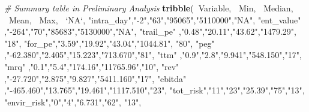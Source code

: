 \documentclass[11pt,a4paper,]{article}
\newenvironment{Shaded}{\begin{snugshade}}{\end{snugshade}}
\newcommand{\CommentTok}[1]{\textcolor[rgb]{0.56,0.35,0.01}{\textit{#1}}}
\newcommand{\DataTypeTok}[1]{\textcolor[rgb]{0.13,0.29,0.53}{#1}}
\newcommand{\KeywordTok}[1]{\textcolor[rgb]{0.13,0.29,0.53}{\textbf{#1}}}
\newcommand{\NormalTok}[1]{#1}
\newcommand{\OperatorTok}[1]{\textcolor[rgb]{0.81,0.36,0.00}{\textbf{#1}}}
\newcommand{\StringTok}[1]{\textcolor[rgb]{0.31,0.60,0.02}{#1}}
\begin{document}
\begin{Shaded}
\begin{Highlighting}[]
\CommentTok{# Summary table in Preliminary Analysis}
\KeywordTok{tribble}\NormalTok{(}\OperatorTok{~}\NormalTok{Variable, }\OperatorTok{~}\NormalTok{Min, }\OperatorTok{~}\NormalTok{Median, }\OperatorTok{~}\NormalTok{Mean, }\OperatorTok{~}\NormalTok{Max, }\OperatorTok{~}\StringTok{`}\DataTypeTok{NA}\StringTok{`}\NormalTok{,}
        \StringTok{"intra_day"}\NormalTok{,}\StringTok{"-2"}\NormalTok{,}\StringTok{"63"}\NormalTok{,}\StringTok{"95065"}\NormalTok{,}\StringTok{"5110000"}\NormalTok{,}\StringTok{"NA"}\NormalTok{,}
        \StringTok{"ent_value"}\NormalTok{ ,}\StringTok{"-264"}\NormalTok{,}\StringTok{"70"}\NormalTok{,}\StringTok{"85683"}\NormalTok{,}\StringTok{"5130000"}\NormalTok{,}\StringTok{"NA"}\NormalTok{,}
        \StringTok{"trail_pe"}\NormalTok{ ,}\StringTok{"0.48"}\NormalTok{,}\StringTok{"20.11"}\NormalTok{,}\StringTok{"43.62"}\NormalTok{,}\StringTok{"1479.29"}\NormalTok{, }\StringTok{"18"}\NormalTok{,}
        \StringTok{"for_pe"}\NormalTok{,}\StringTok{"3.59"}\NormalTok{,}\StringTok{"19.92"}\NormalTok{,}\StringTok{"43.04"}\NormalTok{,}\StringTok{"1044.81"}\NormalTok{, }\StringTok{"80"}\NormalTok{,}
        \StringTok{"peg"}\NormalTok{ ,}\StringTok{"-62.380"}\NormalTok{,}\StringTok{"2.405"}\NormalTok{,}\StringTok{"15.223"}\NormalTok{,}\StringTok{"713.670"}\NormalTok{,}\StringTok{"81"}\NormalTok{,}
        \StringTok{"ttm"}\NormalTok{ ,}\StringTok{"0.9"}\NormalTok{,}\StringTok{"2.8"}\NormalTok{,}\StringTok{"9.941"}\NormalTok{,}\StringTok{"548.150"}\NormalTok{,}\StringTok{"17"}\NormalTok{,}
        \StringTok{"mrq"}\NormalTok{ ,}\StringTok{"0.1"}\NormalTok{,}\StringTok{"5.4"}\NormalTok{,}\StringTok{"174.16"}\NormalTok{,}\StringTok{"11765.96"}\NormalTok{,}\StringTok{"10"}\NormalTok{,}
        \StringTok{"rev"}\NormalTok{ ,}\StringTok{"-27.720"}\NormalTok{,}\StringTok{"2.875"}\NormalTok{,}\StringTok{"9.827"}\NormalTok{,}\StringTok{"5411.160"}\NormalTok{,}\StringTok{"17"}\NormalTok{,}
        \StringTok{"ebitda"}\NormalTok{ ,}\StringTok{"-465.460"}\NormalTok{,}\StringTok{"13.765"}\NormalTok{,}\StringTok{"19.461"}\NormalTok{,}\StringTok{"1117.510"}\NormalTok{,}\StringTok{"23"}\NormalTok{,}
        \StringTok{"tot_risk"}\NormalTok{,}\StringTok{"11"}\NormalTok{,}\StringTok{"23"}\NormalTok{,}\StringTok{"25.39"}\NormalTok{,}\StringTok{"75"}\NormalTok{,}\StringTok{"13"}\NormalTok{,}
        \StringTok{"envir_risk"}\NormalTok{,}\StringTok{"0"}\NormalTok{,}\StringTok{"4"}\NormalTok{,}\StringTok{"6.731"}\NormalTok{,}\StringTok{"62"}\NormalTok{, }\StringTok{"13"}\NormalTok{,}

\end{Highlighting}
\end{Shaded}
\end{document}
